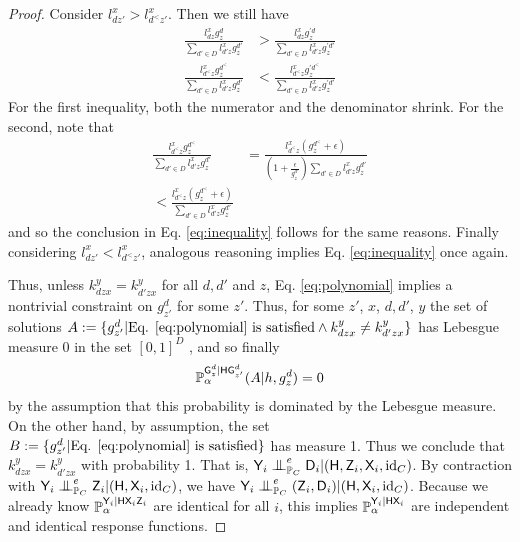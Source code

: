 \begin{proof}
Consider $l^x_{dz'}> l^x_{d^<z'}$. Then we still have
\begin{align}
    \frac{l^x_{dz}g^d_z}{\sum_{d'\in D}l^x_{d'z}g^{d'}_z} &> \frac{l^x_{dz}g^{\prime d}_z}{\sum_{d'\in D}l^x_{d'z}g^{\prime d'}_z}\\
    \frac{l^x_{d^<z}g^{d^<}_z}{\sum_{d'\in D}l^x_{d'z}g^{d'}_z} &< \frac{l^x_{d^<z}g^{\prime d^<}_z}{\sum_{d'\in D}l^x_{d'z}g^{\prime d'}_z}
\end{align}
For the first inequality, both the numerator and the denominator shrink. For the second, note that
\begin{align}
    \frac{l^x_{d^<z}g^{d^<}_z}{\sum_{d'\in D}l^x_{d'z}g^{d'}_z} &= \frac{l^x_{d^<z}(g^{d^<}_z+\epsilon)}{(1+\frac{\epsilon}{g^{d'}_z})\sum_{d'\in D}l^x_{d'z}g^{d'}_z}\\
    < \frac{l^x_{d^<z}(g^{d^<}_z+\epsilon)}{\sum_{d'\in D}l^x_{d'z}g^{d'}_z}
\end{align}
and so the conclusion in Eq. \eqref{eq:inequality} follows for the same reasons. Finally considering $l^x_{dz'}< l^x_{d^<z'}$, analogous reasoning implies Eq. \eqref{eq:inequality} once again.

Thus, unless $k^y_{dzx}=k^y_{d'zx}$ for all $d,d'$ and $z$, Eq. \eqref{eq:polynomial} implies a nontrivial constraint on  $g^d_{z'}$ for some $z'$. Thus, for some $z'$, $x$, $d,d'$, $y$ the set of solutions $A:=\{g^d_{z'}|\text{Eq. \eqref{eq:polynomial} is satisfied}\land k^y_{dzx}\neq k^y_{d'zx}\}$ has Lebesgue measure 0 in the set $[0,1]^{D}$ \citep{okamoto_distinctness_1973}, and so finally
\begin{align}
    \mathbb{P}_\alpha^{\mathsf{G}^d_{z}|\mathsf{H}\mathsf{G}^d_{z'}}(A|h,g^d_{z}) = 0
\end{align}
by the assumption that this probability is dominated by the Lebesgue measure. On the other hand, by assumption, the set $B:=\{g^d_{z'}|\text{Eq. \eqref{eq:polynomial} is satisfied}\}$ has measure 1. Thus we conclude that $k^y_{dzx}=k^y_{d'zx}$ with probability 1. That is, $\RV{Y}_i\CI_{\prob{P}_C}^e \RV{D}_i|(\RV{H},\RV{Z}_i,\RV{X}_i,\text{id}_C)$. By contraction with $\RV{Y}_i\CI^e_{\prob{P}_C} \RV{Z}_i|(\RV{H},\RV{X}_i,\text{id}_C)$, we have $\RV{Y}_i\CI^e_{\prob{P}_C} (\RV{Z}_i,\RV{D}_i)|(\RV{H},\RV{X}_i,\text{id}_C)$. Because we already know $\mathbb{P}_\alpha^{\mathsf{Y}_i|\mathsf{H}\mathsf{X}_i\mathsf{Z}_i}$ are identical for all $i$, this implies $\mathbb{P}_\alpha^{\mathsf{Y}_i|\mathsf{H}\mathsf{X}_i}$ are independent and identical response functions.
\end{proof}

